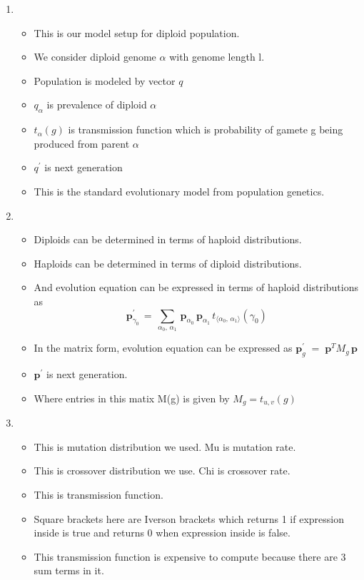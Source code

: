 \documentclass{article}
\begin{document}
\begin{enumerate}
\item
  \begin{itemize}
  \item This is our model setup for diploid population.
  \item We consider diploid genome $\alpha$ with genome length l.
  \item Population is modeled by vector $q$
  \item $q_\alpha$ is prevalence of diploid $\alpha$
  \item $t_{\alpha}(g)$ is transmission function which is probability
    of gamete g being produced from parent $\alpha$
  \item $q^\prime$ is next generation
  \item This is the standard evolutionary model from population genetics. 
  \end{itemize}
    
\item
  \begin{itemize}
  \item Diploids can be determined in terms of haploid
    distributions.
  \item Haploids can be determined in terms of diploid
    distributions.
  \item And evolution equation can be expressed in terms of haploid
    distributions as 
    \[\bm{p}_{\gamma_0}^{\prime} \,=\, \sum_{\alpha_0, \, \alpha_1} \, \bm{p}_{\alpha_0} \, \bm{p}_{\alpha_1} \,
	  t_{\langle \alpha_0, \,\alpha_1 \rangle}(\gamma_0) \]	  
  
  \item In the matrix form, evolution equation can be expressed as $\bm{p}_g^\prime \; = \; \bm{p}^T M_g \, \bm{p}$
  \item $\bm{p}^\prime$ is next generation.
  \item Where entries in this matix M(g) is given by $M_g = t_{u,v}(g)$
  \end{itemize}
    
\item
  \begin{itemize}
  \item This is mutation distribution we used. Mu is mutation rate.
  \item This is crossover distribution we use. Chi is crossover rate.
  \item This is transmission function.
  \item Square brackets here are Iverson brackets which returns 1 if expression inside is true and returns 0 when expression inside is false.
  \item This transmission function is expensive to compute because there are 3 sum terms in it.
  \end{itemize}
    

\end{enumerate}
\end{document}
